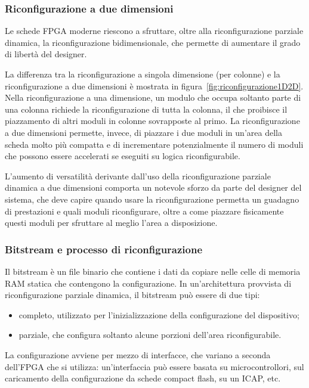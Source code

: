 \subsubsection{Riconfigurazione a due dimensioni}
Le schede \ac{FPGA} moderne riescono a sfruttare, oltre alla riconfigurazione parziale
dinamica, la riconfigurazione bidimensionale, che permette di aumentare il grado di
libertà del designer.

La differenza tra la riconfigurazione a singola dimensione (per colonne) e la
riconfigurazione a due dimensioni è mostrata in figura~\ref{fig:riconfigurazione1D2D}.
Nella riconfigurazione a una dimensione, un modulo che occupa soltanto parte di una
colonna richiede la riconfigurazione di tutta la colonna, il che proibisce il piazzamento
di altri moduli in colonne sovrapposte al primo. La riconfigurazione a due dimensioni
permette, invece, di piazzare i due moduli in un'area della scheda molto più compatta e di
incrementare potenzialmente il numero di moduli che possono essere accelerati se eseguiti
su logica riconfigurabile.

L'aumento di versatilità derivante dall'uso della riconfigurazione parziale dinamica
a due dimensioni comporta un notevole sforzo da parte del designer del sistema,
che deve capire quando usare la riconfigurazione permetta un guadagno di prestazioni
e quali moduli riconfigurare, oltre a come piazzare fisicamente questi moduli per sfruttare al
meglio l'area a disposizione.

\subsubsection{Bitstream e processo di riconfigurazione}
Il bitstream è un file binario che contiene i dati da copiare nelle celle di memoria RAM
statica che contengono la configurazione. In un'architettura provvista di
riconfigurazione parziale dinamica, il bitstream può essere di due tipi:
\begin{itemize}
 \item completo, utilizzato per l'inizializzazione della configurazione del dispositivo;
 \item parziale, che configura soltanto alcune porzioni dell'area riconfigurabile.
\end{itemize}

La configurazione avviene per mezzo di interfacce, che variano a seconda dell'\ac{FPGA}
che si utilizza: un'interfaccia può essere basata su microcontrollori, sul caricamento
della configurazione da schede compact flash, su un \ac{ICAP}, etc.

